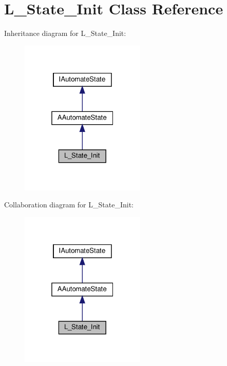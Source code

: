 \hypertarget{classL__State__Init}{}\section{L\+\_\+\+State\+\_\+\+Init Class Reference}
\label{classL__State__Init}


Inheritance diagram for L\+\_\+\+State\+\_\+\+Init\+:
\nopagebreak
\begin{figure}[H]
\begin{center}
\leavevmode
\includegraphics[width=169pt]{classL__State__Init__inherit__graph}
\end{center}
\end{figure}


Collaboration diagram for L\+\_\+\+State\+\_\+\+Init\+:
\nopagebreak
\begin{figure}[H]
\begin{center}
\leavevmode
\includegraphics[width=169pt]{classL__State__Init__coll__graph}
\end{center}
\end{figure}
